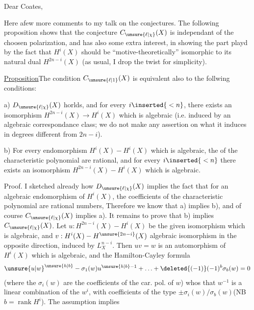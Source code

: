 

Dear Coates,

Here a\inserted{\ }few more comments to my talk on the conjectures. The following proposition shows that the conjecture $C_{\unsure{\ell|\chi}}(X)$ is independant of the choosen polarization, and has also some extra interest, in showing the part playd by the fact that $H^i(X)$ should be ``motive-theoretically'' isomorphic to its natural dual $H^{2n-i}(X)$ (as usual, I drop the twist for simplicity).

\uline{Proposition}\quad The condition $C_{\unsure{\ell|1}}(X)$ is equivalent also to  the follwing conditions:

a) $D_{\unsure{\ell|\chi}}(X)$ horlds, and for every $i\inserted{{}<n}$, there exists an isomorphism $H^{2n-i}(X)\to H^i(X)$ which is algebraic (i.e. induced by an algebraic correspondance class; we do not make any assertion on what it induces in degrees different from $2n-i$).

b) For every endomorphism $H^i(X)\mathbin{-}H^i(X)$ which is algebraic, the  of the characteristic polynomial are rational, and for every $i\inserted{{}<n}$ there exists an isomorphism $H^{2n-i}(X)\mathbin{-}H^i(X)$ which is algebraic.

Proof. I sketched already how $D_{\unsure{\ell|\chi}}(X)$ implies the fact that for an algebraic endomorphism of $H^i(X)$, the coefficients of the characteristic polynomial are rational numbers, Therefore we know that a) implies b), and of course $C_{\unsure{\ell|\chi}}(X)$ implies a). It remains to prove that b) implies $C_{\unsure{\ell|\chi}}(X)$. Let $u:H^{2n-i}(X)\mathbin{-}H^i(X)$ be the given isomorphism which is algebraic, and $v:H^i(X)\mathbin{-}H^{\unsure{2n-i}}(X)$  algebraic isomorphism in the opposite direction, induced by $L_X^{n-i}$. Then $uv=w$ is an automorphism of $H^i(X)$ which is algebraic, and the Hamilton-Cayley formula
\[
\unsure{u|w}^{\unsure{h|b}}-\sigma_1(w)u^{\unsure{h|b}-1}+\ldots+\deleted{(-1)}(-1)^b\sigma_b(w)=0
\]
(where the $\sigma_i(w)$ are the coefficients of the car. pol. of $w$) whos that $w^{-1}$ is a linear combination of the $w^i$, with coefficients of the type $\pm\sigma_i(w)/\sigma_b(w)$\quad (NB $b=\operatorname{rank}H^i$). The assumption implies

